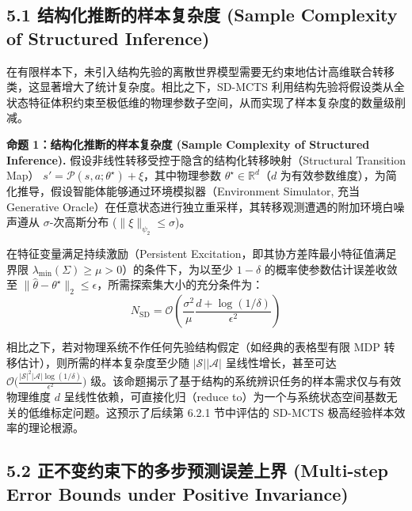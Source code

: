 \documentclass[UTF8]{ctexart}
\begin{document}
\hypertarget{ux7ed3ux6784ux5316ux63a8ux65adux7684ux6837ux672cux590dux6742ux5ea6-sample-complexity-of-structured-inference}{%
\subsection{5.1 结构化推断的样本复杂度 (Sample Complexity of Structured
Inference)}\label{ux7ed3ux6784ux5316ux63a8ux65adux7684ux6837ux672cux590dux6742ux5ea6-sample-complexity-of-structured-inference}}

在有限样本下，未引入结构先验的离散世界模型需要无约束地估计高维联合转移类，这显著增大了统计复杂度。相比之下，SD-MCTS 利用结构先验将假设类从全状态特征体积约束至极低维的物理参数子空间，从而实现了样本复杂度的数量级削减。

\textbf{命题 1：结构化推断的样本复杂度 (Sample Complexity of Structured Inference). }
假设非线性转移受控于隐含的结构化转移映射（Structural Transition Map）
\(s' = \mathcal{P}(s, a ; \theta^\star) + \xi\)，其中物理参数
\(\theta^\star \in \mathbb{R}^d\)（\(d\) 为有效参数维度），为简化推导，假设智能体能够通过环境模拟器（Environment
Simulator, 充当Generative Oracle）在任意状态进行独立重采样，其转移观测遭遇的附加环境白噪声遵从
\(\sigma\)-次高斯分布 (\(\|\xi\|_{\psi_2} \leq \sigma\))。

在特征变量满足持续激励（Persistent Excitation，即其协方差阵最小特征值满足界限 $\lambda_{\text{min}}(\Sigma) \ge \mu > 0$）的条件下，为以至少 $1-\delta$ 的概率使参数估计误差收敛至 $\|\hat{\theta} - \theta^\star\|_2 \le \epsilon$，所需探索集大小的充分条件为：
\[ N_{\text{SD}} = \mathcal{O}\left( \frac{\sigma^2}{\mu} \frac{d + \log(1/\delta)}{\epsilon^2} \right) \]

相比之下，若对物理系统不作任何先验结构假定（如经典的表格型有限 MDP 转移估计），则所需的样本复杂度至少随 \(|\mathcal{S}||\mathcal{A}|\) 呈线性增长，甚至可达
\(\mathcal{O}\big( \frac{|\mathcal{S}|^2|\mathcal{A}| \log(1/\delta)}{\epsilon^2} \big)\) 级。该命题揭示了基于结构的系统辨识任务的样本需求仅与有效物理维度 \(d\) 呈线性依赖，可直接化归（reduce to）为一个与系统状态空间基数无关的低维标定问题。这预示了后续第 6.2.1 节中评估的 SD-MCTS 极高经验样本效率的理论根源。

\hypertarget{ux6291ux5236-ood-ux6563ux9038ux4eceux6307ux6570ux7ea7ux590dux5408ux8befux5deeux5230ux5b88ux6052ux754cux5ea6-bounding-compounding-errors-via-conservation}{%
\subsection{5.2 正不变约束下的多步预测误差上界 (Multi-step Error Bounds under Positive Invariance)}\label{ux6291ux5236-ood-ux6563ux9038ux4eceux6307ux6570ux7ea7ux590dux5408ux8befux5deeux5230ux5b88ux6052ux754cux5ea6-bounding-compounding-errors-via-conservation}}
\end{document}
